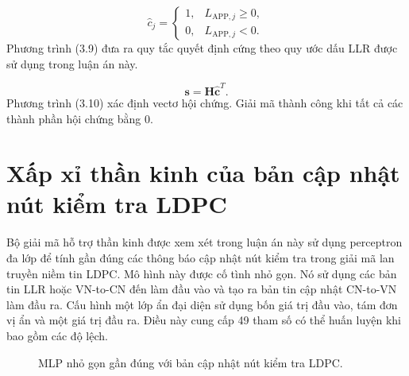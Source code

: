 \begin{equation}
\hat{c}_j=\begin{cases}1,&L_{\mathrm{APP},j}\ge 0,\\0,&L_{\mathrm{APP},j}<0.\end{cases}
\end{equation}
Phương trình (3.9) đưa ra quy tắc quyết định cứng theo quy ước dấu LLR được sử dụng trong luận án này.

\begin{equation}
\mathbf{s}=\mathbf{H}\hat{\mathbf{c}}^{T}.
\end{equation}
Phương trình (3.10) xác định vectơ hội chứng. Giải mã thành công khi tất cả các thành phần hội chứng bằng 0.

\section{Xấp xỉ thần kinh của bản cập nhật nút kiểm tra LDPC}
Bộ giải mã hỗ trợ thần kinh được xem xét trong luận án này sử dụng perceptron đa lớp để tính gần đúng các thông báo cập nhật nút kiểm tra trong giải mã lan truyền niềm tin LDPC. Mô hình này được cố tình nhỏ gọn. Nó sử dụng các bản tin LLR hoặc VN-to-CN đến làm đầu vào và tạo ra bản tin cập nhật CN-to-VN làm đầu ra. Cấu hình một lớp ẩn đại diện sử dụng bốn giá trị đầu vào, tám đơn vị ẩn và một giá trị đầu ra. Điều này cung cấp 49 tham số có thể huấn luyện khi bao gồm các độ lệch.

\begin{figure}[H]
\centering
{}
\caption{MLP nhỏ gọn gần đúng với bản cập nhật nút kiểm tra LDPC.}
\label{fig:ann_ldpc_mlp}
\end{figure}

